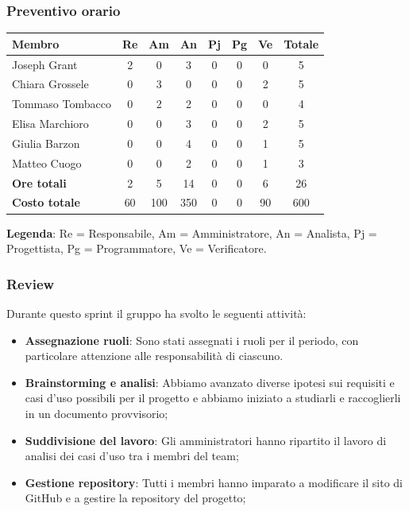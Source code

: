 \documentclass[11pt,a4paper]{article}
\begin{document}
\subsubsection{Preventivo orario}
\begin{center}
    \begin{tabular}{|l|c|c|c|c|c|c|c|}
        \hline
        \textbf{Membro} & \textbf{Re} & \textbf{Am} & \textbf{An} & \textbf{Pj} & \textbf{Pg} & \textbf{Ve} & \textbf{Totale} \\
        \hline
        Joseph Grant & 2 & 0 & 3 & 0 & 0 & 0 & 5 \\
        \hline
        Chiara Grossele & 0 & 3 & 0 & 0 & 0 & 2 & 5 \\
        \hline
        Tommaso Tombacco & 0 & 2 & 2 & 0 & 0 & 0 & 4 \\
        \hline
        Elisa Marchioro & 0 & 0 & 3 & 0 & 0 & 2 & 5 \\
        \hline
        Giulia Barzon & 0 & 0 & 4 & 0 & 0 & 1 & 5 \\
        \hline
        Matteo Cuogo & 0 & 0 & 2 & 0 & 0 & 1 & 3 \\
        \hline
        \textbf{Ore totali} & 2 & 5 & 14 & 0 & 0 & 6 & 26 \\
        \hline
        \textbf{Costo totale} & 60 & 100 & 350 & 0 & 0 & 90 & 600 \\
        \hline
    \end{tabular}
\end{center}

\noindent \textbf{Legenda}: Re = Responsabile, Am = Amministratore, An = Analista, Pj = Progettista, Pg = Programmatore, Ve = Verificatore.

\subsubsection{Review}
Durante questo sprint il gruppo ha svolto le seguenti attività:
\begin{itemize}
    \item \textbf{Assegnazione ruoli}: Sono stati assegnati i ruoli per il periodo, con particolare attenzione alle responsabilità di ciascuno.
    \item \textbf{Brainstorming e analisi}: Abbiamo avanzato diverse ipotesi sui requisiti e casi d'uso possibili per il progetto e abbiamo iniziato a studiarli e raccoglierli in un documento provvisorio;
    \item \textbf{Suddivisione del lavoro}: Gli amministratori hanno ripartito il lavoro di analisi dei casi d'uso tra i membri del team;
    \item \textbf{Gestione repository}: Tutti i membri hanno imparato a modificare il sito di GitHub e a gestire la repository del progetto;
\end{itemize}
\end{document}

